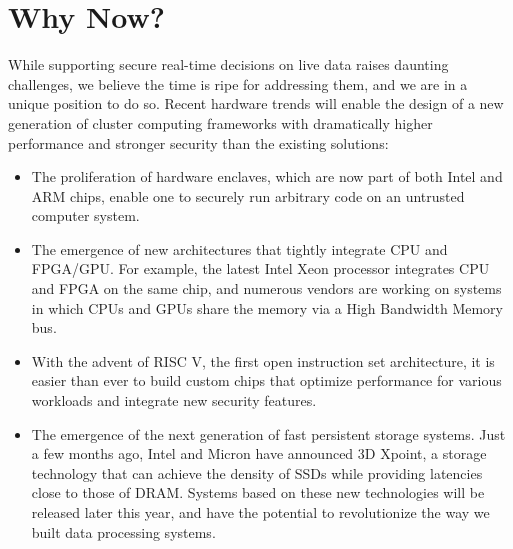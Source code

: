 \section{Why Now?}

While supporting secure real-time decisions on live data raises daunting challenges, we believe the time is ripe for addressing them, and we are in a unique position to do so. Recent hardware trends will enable the design of a new generation of cluster computing frameworks with dramatically higher performance and stronger security than the existing solutions: 

\begin{itemize}[noitemsep,topsep=0pt,parsep=0pt,partopsep=0pt]
\item The proliferation of hardware enclaves, which are now part of both Intel and ARM chips, enable one to securely run arbitrary code on an untrusted computer system.

\item The emergence of new architectures that tightly integrate CPU and FPGA/GPU. For example, the latest Intel Xeon processor integrates CPU and FPGA on the same chip, and numerous vendors are working on systems in which  CPUs and GPUs share the memory via a High Bandwidth Memory bus.  

\item With the advent of RISC V, the first open instruction set architecture, it is easier than ever to build custom chips that optimize performance for various workloads and integrate new security features.

\item The emergence of the next generation of fast persistent storage systems. Just a few months ago, Intel and Micron have announced 3D Xpoint, a storage technology that can achieve the density of SSDs while providing latencies close to those of DRAM. Systems based on these new technologies will be released later this year, and have the potential to revolutionize the way we built data processing systems.
\end{itemize}

